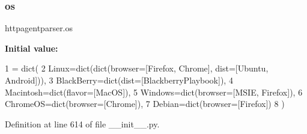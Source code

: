 \subsubsection{\texorpdfstring{os}{os}}
{\footnotesize\ttfamily httpagentparser.\+os}

{\bfseries Initial value\+:}
\begin{DoxyCode}
1 =  dict(
2         Linux=dict(dict(browser=[Firefox, Chrome], dist=[Ubuntu, Android])),
3         BlackBerry=dict(dist=[BlackberryPlaybook]),
4         Macintosh=dict(flavor=[MacOS]),
5         Windows=dict(browser=[MSIE, Firefox]),
6         ChromeOS=dict(browser=[Chrome]),
7         Debian=dict(browser=[Firefox])
8     )
\end{DoxyCode}


Definition at line 614 of file \+\_\+\+\_\+init\+\_\+\+\_\+.\+py.

